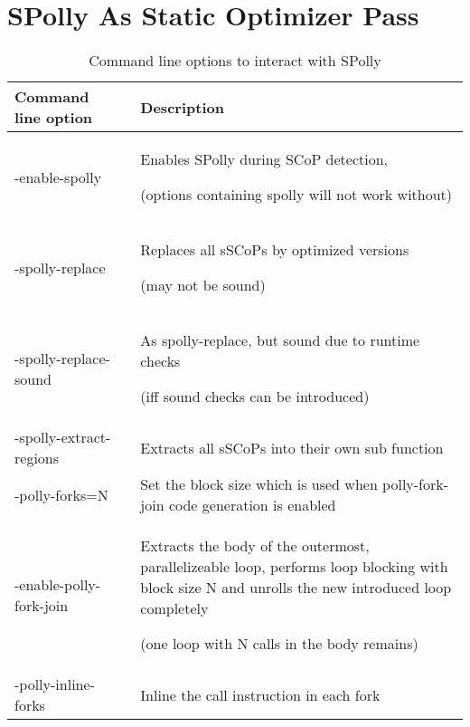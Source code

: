 
\chapter{SPolly As Static Optimizer Pass}
\label{AppendixB}

\begin{table}[htbp]
  \caption{Command line options to interact with SPolly}
  \begin{tabularx}{\textwidth}{ l p{1mm} X  }
    Command line option     && Description  \\
    \hline
    -enable-spolly          && Enables SPolly during SCoP detection,\par
                                (options containing spolly will not work without) \\ 
    -spolly-replace         && Replaces all sSCoPs by optimized versions \par 
                                (may not be sound)  \\
    -spolly-replace-sound   && As spolly-replace, but sound due to runtime checks \par
                                (iff sound checks can be introduced)\\
    -spolly-extract-regions && Extracts all sSCoPs into their own sub function \\
    -polly-forks=N          && Set the block size which is used when 
                             polly-fork-join code generation is enabled\\
    -enable-polly-fork-join && Extracts the body of the outermost,
                             parallelizeable loop, performs loop blocking with
                             block size N and unrolls the new introduced loop 
                             completely \par
                             (one loop with N calls in the body remains)\\
    -polly-inline-forks     && Inline the call instruction in each fork \\
  \end{tabularx}
  \label{tab:CommandLineOptions}
\end{table}

